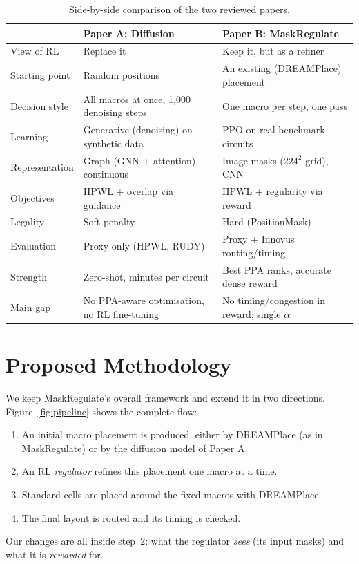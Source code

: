 \documentclass{article}
\begin{document}
\begin{table}[t]
\centering
\caption{Side-by-side comparison of the two reviewed papers.}
\label{tab:compare}
\small
\begin{tabular}{@{}L{3.0cm}L{5.6cm}L{5.6cm}@{}}
\toprule
 & \textbf{Paper A: Diffusion} \citep{lee2025diffusion} & \textbf{Paper B: MaskRegulate} \citep{xue2024maskregulate} \\
\midrule
View of RL & Replace it & Keep it, but as a refiner \\
Starting point & Random positions & An existing (DREAMPlace) placement \\
Decision style & All macros at once, 1{,}000 denoising steps & One macro per step, one pass \\
Learning & Generative (denoising) on synthetic data & PPO on real benchmark circuits \\
Representation & Graph (GNN + attention), continuous & Image masks ($224^2$ grid), CNN \\
Objectives & HPWL + overlap via guidance & HPWL + regularity via reward \\
Legality & Soft penalty & Hard (PositionMask) \\
Evaluation & Proxy only (HPWL, RUDY) & Proxy + Innovus routing/timing \\
Strength & Zero-shot, minutes per circuit & Best PPA ranks, accurate dense reward \\
Main gap & No PPA-aware optimisation, no RL fine-tuning & No timing/congestion in reward; single $\alpha$ \\
\bottomrule
\end{tabular}
\end{table}

\section{Proposed Methodology}
\label{sec:method}

We keep MaskRegulate's overall framework and extend it in two directions. Figure~\ref{fig:pipeline}
shows the complete flow:
\begin{enumerate}
  \item An initial macro placement is produced, either by DREAMPlace (as in MaskRegulate) or by the
  diffusion model of Paper A.
  \item An RL \emph{regulator} refines this placement one macro at a time.
  \item Standard cells are placed around the fixed macros with DREAMPlace.
  \item The final layout is routed and its timing is checked.
\end{enumerate}
Our changes are all inside step~2: what the regulator \emph{sees} (its input masks) and what it is
\emph{rewarded} for.
\end{document}
